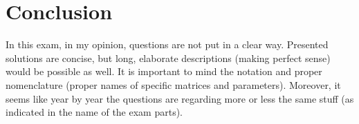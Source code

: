 \section*{Conclusion}\label{sec:conclusion}

In this exam, in my opinion, questions are not put in a clear way. Presented solutions are concise, but long, elaborate descriptions (making perfect sense) would be possible as well. It is important to mind the notation and proper nomenclature (proper names of specific matrices and parameters). Moreover, it seems like year by year the questions are regarding more or less the same stuff (as indicated in the name of the exam parts). 

